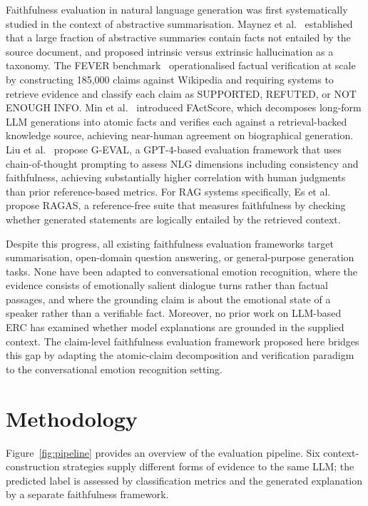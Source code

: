 \documentclass[runningheads]{llncs}
\begin{document}
Faithfulness evaluation in natural language generation was first
systematically studied in the context of abstractive summarisation.
Maynez et al.~\cite{maynez2020faithfulness} established that a large
fraction of abstractive summaries contain facts not entailed by the
source document, and proposed intrinsic versus extrinsic hallucination
as a taxonomy. The FEVER benchmark~\cite{thorne2018fever} operationalised
factual verification at scale by constructing 185,000 claims against
Wikipedia and requiring systems to retrieve evidence and classify each
claim as SUPPORTED, REFUTED, or NOT ENOUGH INFO. Min et
al.~\cite{min2023factscore} introduced FActScore, which decomposes
long-form LLM generations into atomic facts and verifies each against a
retrieval-backed knowledge source, achieving near-human agreement on
biographical generation. Liu et al.~\cite{liu2023geval} propose G-EVAL,
a GPT-4-based evaluation framework that uses chain-of-thought prompting
to assess NLG dimensions including consistency and faithfulness, achieving
substantially higher correlation with human judgments than prior
reference-based metrics. For RAG systems specifically, Es et
al.~\cite{es2023ragas} propose RAGAS, a reference-free suite that
measures faithfulness by checking whether generated statements are
logically entailed by the retrieved context.

Despite this progress, all existing faithfulness evaluation frameworks
target summarisation, open-domain question answering, or general-purpose
generation tasks. None have been adapted to conversational emotion
recognition, where the evidence consists of emotionally salient dialogue
turns rather than factual passages, and where the grounding claim is
about the emotional state of a speaker rather than a verifiable fact.
Moreover, no prior work on LLM-based ERC has examined whether
model explanations are grounded in the supplied context. The claim-level
faithfulness evaluation framework proposed here bridges this gap by adapting the
atomic-claim decomposition and verification paradigm to the conversational
emotion recognition setting.

\section{Methodology}
\label{sec:method}

Figure~\ref{fig:pipeline} provides an overview of the evaluation pipeline.
Six context-construction strategies supply different forms of evidence to
the same LLM; the predicted label is assessed by classification metrics
and the generated explanation by a separate faithfulness framework.
\end{document}
